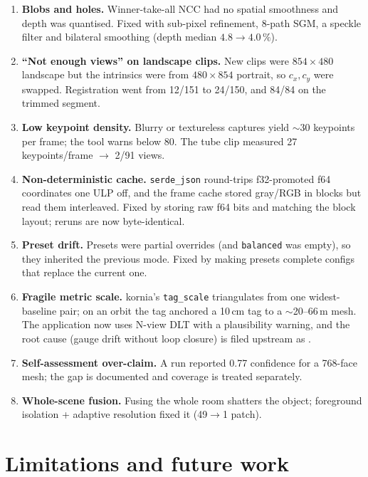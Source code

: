 \documentclass[11pt,a4paper]{article}
\newcommand{\pct}{\,\%}
\newcommand{\code}[1]{\texttt{#1}}
\begin{document}
\begin{enumerate}[leftmargin=1.5em]
\item \textbf{Blobs and holes.} Winner-take-all NCC had no spatial smoothness and depth was
quantised. Fixed with sub-pixel refinement, 8-path SGM, a speckle filter and bilateral
smoothing (depth median $4.8\to4.0\pct$).
\item \textbf{``Not enough views'' on landscape clips.} New clips were $854\times480$ landscape
but the intrinsics were from $480\times854$ portrait, so $c_x,c_y$ were swapped. Registration
went from 12/151 to 24/150, and 84/84 on the trimmed segment.
\item \textbf{Low keypoint density.} Blurry or textureless captures yield $\sim$30 keypoints per
frame; the tool warns below 80. The tube clip measured 27 keypoints/frame $\to$ 2/91 views.
\item \textbf{Non-deterministic cache.} \code{serde\_json} round-trips f32-promoted f64
coordinates one ULP off, and the frame cache stored gray/RGB in blocks but read them
interleaved. Fixed by storing raw f64 bits and matching the block layout; reruns are now
byte-identical.
\item \textbf{Preset drift.} Presets were partial overrides (and \code{balanced} was empty), so
they inherited the previous mode. Fixed by making presets complete configs that replace the
current one.
\item \textbf{Fragile metric scale.} kornia's \code{tag\_scale} triangulates from one
widest-baseline pair; on an orbit the tag anchored a 10\,cm tag to a $\sim$20--66\,m mesh. The
application now uses N-view DLT with a plausibility warning, and the root cause (gauge drift
without loop closure) is filed upstream as \cite{loopclosure}.
\item \textbf{Self-assessment over-claim.} A run reported 0.77 confidence for a 768-face mesh;
the gap is documented and coverage is treated separately.
\item \textbf{Whole-scene fusion.} Fusing the whole room shatters the object; foreground
isolation + adaptive resolution fixed it (49$\to$1 patch).
\end{enumerate}

\section{Limitations and future work}
\label{sec:future}
\end{document}
